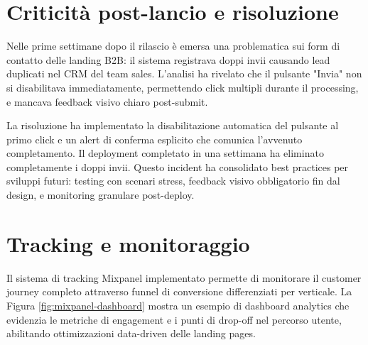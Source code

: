 

\section{Criticità post-lancio e risoluzione}

Nelle prime settimane dopo il rilascio è emersa una problematica sui form di 
contatto delle landing B2B: il sistema registrava doppi invii causando lead 
duplicati nel CRM del team sales. L'analisi ha rivelato che il pulsante "Invia" 
non si disabilitava immediatamente, permettendo click multipli durante il 
processing, e mancava feedback visivo chiaro post-submit.

La risoluzione ha implementato la disabilitazione automatica del pulsante al 
primo click e un alert di conferma esplicito che comunica l'avvenuto 
completamento. Il deployment completato in una settimana ha eliminato 
completamente i doppi invii. Questo incident ha consolidato best practices 
per sviluppi futuri: testing con scenari stress, feedback visivo obbligatorio 
fin dal design, e monitoring granulare post-deploy.

\section{Tracking e monitoraggio}

Il sistema di tracking Mixpanel implementato permette di monitorare il customer 
journey completo attraverso funnel di conversione differenziati per verticale. 
La Figura \ref{fig:mixpanel-dashboard} mostra un esempio di dashboard analytics 
che evidenzia le metriche di engagement e i punti di drop-off nel percorso utente, 
abilitando ottimizzazioni data-driven delle landing pages.


